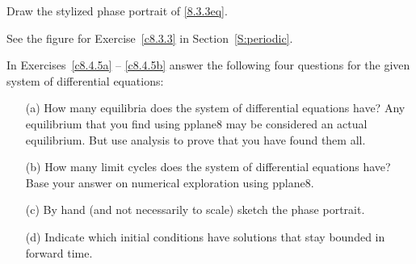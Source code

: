 \documentclass{ximera}
\begin{document}
\begin{exercise} \label{c8.4.4}
Draw the stylized phase portrait of \eqref{8.3.3eq}.

\begin{solution}
See the figure for Exercise~\ref{c8.3.3} in
Section~\ref{S:periodic}.

\end{solution}
\end{exercise}

\noindent In Exercises~\ref{c8.4.5a} -- \ref{c8.4.5b} answer the following 
four questions for the given system of differential equations:
\begin{itemize}
\item[(a)]  How many equilibria does the system of differential equations 
have?  Any equilibrium that you find using {\sf pplane8} may be considered an 
actual equilibrium.  But use analysis to prove that you have found them all.
\item[(b)]  How many limit cycles does the system of differential equations 
have?  Base your answer on numerical exploration using {\sf pplane8}.
\item[(c)]  By hand (and not necessarily to scale) sketch the phase portrait.
\item[(d)]  Indicate which initial conditions have solutions that stay
bounded in forward time.
\end{itemize}
\end{document}

